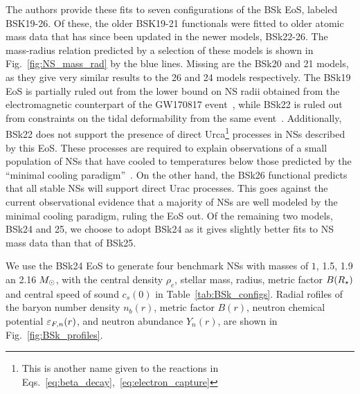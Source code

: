 The authors provide these fits to seven configurations of the BSk EoS, labeled BSK19-26. Of these, the older BSK19-21  functionals were fitted to older atomic mass data that has since been updated in the newer models, BSk22-26. The mass-radius relation predicted by a selection of these models is shown in Fig.~\ref{fig:NS_mass_rad} by the blue lines. Missing are the BSk20 and 21 models, as they give very similar results to the 26 and 24 models respectively. The BSk19 EoS is partially ruled out from the lower bound on NS radii obtained from the electromagnetic counterpart of the GW170817 event~\cite{Koppel:2019pys_Generalrelativisticdeterminationthreshold}, while BSk22 is ruled out from constraints on the tidal deformability from the same event~\cite{Perot:2019gwl_Rolesymmetryenergy}. Additionally, BSk22 does not support the presence of direct Urca\footnote{This is another name given to the reactions in Eqs.~\ref{eq:beta_decay},~\ref{eq:electron_capture}} processes in NSs described by this EoS. These processes are required to explain observations of a small population of NSs that have cooled to temperatures below those predicted by the ``minimal cooling paradigm''~\cite{Gusakov:2004se_Enhancedcoolingneutron, Page:2004fy_MinimalCoolingNeutron}. On the other hand, the BSk26 functional predicts that all stable NSs will support direct Urac processes. This goes against the current observational evidence that a majority of NSs are well modeled by the minimal cooling paradigm, ruling the EoS out. Of the remaining two models, BSk24 and 25, we choose to adopt BSk24 as it gives slightly better fits to NS mass data than that of BSk25. 

We use the BSk24 EoS to generate four benchmark NSs with masses of $1$, 1.5, 1.9 an 2.16$\;M_\odot$, with the central density $\rho_c$, stellar mass, radius, metric factor $B(R_\star)$ and central speed of sound $c_s(0)$ in Table~\ref{tab:BSk_configs}. 
Radial rofiles of the baryon number density $n_b(r)$, metric factor $B(r)$, neutron chemical potential $\varepsilon_{F,n}(r)$, and neutron abundance  $Y_n(r)$, are shown in Fig.~\ref{fig:BSk_profiles}. 



